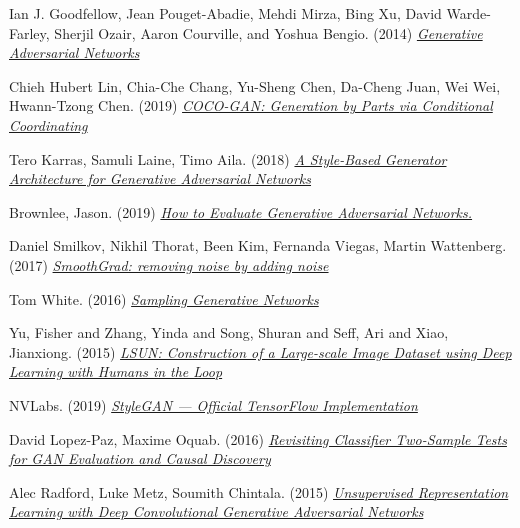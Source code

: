 \documentclass[12pt]{article}
\begin{document}
    \begin{thebibliography}{9}
        Ian J. Goodfellow, Jean Pouget-Abadie, Mehdi Mirza, Bing Xu, David Warde-Farley, Sherjil Ozair, Aaron Courville, and Yoshua Bengio. (2014)
        \href{https://papers.nips.cc/paper/2014/file/5ca3e9b122f61f8f06494c97b1afccf3-Paper.pdf}{\textit{Generative Adversarial Networks} }

        Chieh Hubert Lin, Chia-Che Chang, Yu-Sheng Chen, Da-Cheng Juan, Wei Wei, Hwann-Tzong Chen. (2019)
        \href{https://arxiv.org/pdf/1904.00284.pdf}{\textit{COCO-GAN: Generation by Parts via Conditional Coordinating} }

        Tero Karras, Samuli Laine, Timo Aila. (2018)
        \href{https://arxiv.org/pdf/1812.04948.pdf}{\textit{A Style-Based Generator Architecture for Generative Adversarial Networks} }

        Brownlee, Jason. (2019)
        \href{https://machinelearningmastery.com/how-to-evaluate-generative-adversarial-networks/}{\textit{How to Evaluate Generative Adversarial Networks.} }

        Daniel Smilkov, Nikhil Thorat, Been Kim, Fernanda Viegas, Martin Wattenberg. (2017)
        \href{https://arxiv.org/pdf/1706.03825.pdf}{\textit{SmoothGrad: removing noise by adding noise} }

        Tom White. (2016)
        \href{https://arxiv.org/pdf/1609.04468.pdf}{\textit{Sampling Generative Networks} }

        Yu, Fisher and Zhang, Yinda and Song, Shuran and Seff, Ari and Xiao, Jianxiong. (2015)
        \href{https://arxiv.org/pdf/1506.03365.pdf}{\textit{LSUN: Construction of a Large-scale Image Dataset using Deep Learning with Humans in the Loop}}

        NVLabs. (2019) \href{https://github.com/NVlabs/stylegan}{\textit{StyleGAN — Official TensorFlow Implementation}}

        David Lopez-Paz, Maxime Oquab. (2016)
        \href{https://research.fb.com/wp-content/uploads/2017/04/neural_tests.pdf?}{\textit{Revisiting Classifier Two-Sample Tests for GAN Evaluation and Causal Discovery}}

        Alec Radford, Luke Metz, Soumith Chintala. (2015)
        \href{https://arxiv.org/pdf/1511.06434.pdf}{\textit{Unsupervised Representation Learning with Deep Convolutional Generative Adversarial Networks}}

    \end{thebibliography}
\end{document}
